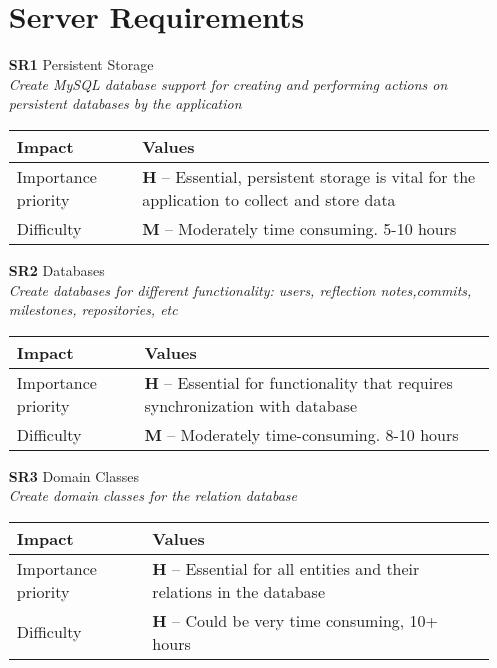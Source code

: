 \begin{itemize}
    \section{Server Requirements}
    \item[\textbf{SR1}] Persistent Storage\\
        \textit{\small{Create MySQL database support for creating and performing actions on persistent databases by the application}}

        \begin{tabular}{| l | p{7cm} |}
            \hline
            \rowcolor[gray]{0.8}
            \textbf{Impact} & \textbf{Values} \\
            \hline
            Importance priority & \textbf{H} -- Essential, persistent storage is vital for the application to collect and store data\\
            Difficulty & \textbf{M} -- Moderately time consuming. 5-10 hours\\
            \hline
        \end{tabular}
    \vspace{0.5cm}

    \item[\textbf{SR2}] Databases\\
        \textit{\small{Create databases for different functionality: users, reflection notes,commits, milestones, repositories, etc}}

        \begin{tabular}{| l | p{7cm} |}
            \hline
            \rowcolor[gray]{0.8}
            \textbf{Impact} & \textbf{Values} \\
            \hline
            Importance priority & \textbf{H} -- Essential for functionality that requires synchronization with database\\
            Difficulty & \textbf{M} -- Moderately time-consuming. 8-10 hours\\
            \hline
        \end{tabular}
    \vspace{0.5cm}

    \item[\textbf{SR3}] Domain Classes\\
        \textit{\small{Create domain classes for the relation database}}

        \begin{tabular}{| l | p{7cm} |}
            \hline
            \rowcolor[gray]{0.8}
            \textbf{Impact} & \textbf{Values} \\
            \hline
            Importance priority & \textbf{H} -- Essential for all entities and their relations in the database \\
            Difficulty & \textbf{H} -- Could be very time consuming, 10+ hours \\
            \hline
        \end{tabular}
    \vspace{0.5cm}
\end{itemize}